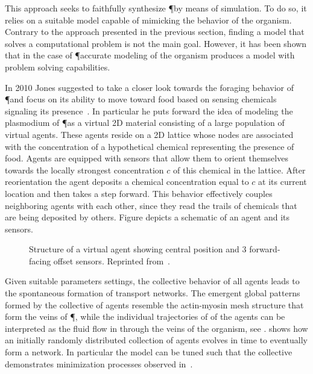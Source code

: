 			This approach seeks to faithfully synthesize \P by means of simulation. To do so, it relies on a suitable model capable of mimicking the behavior of the organism. Contrary to the approach presented in the previous section, finding a model that solves a computational problem is not the main goal. However, it has been shown that in the case of \P accurate modeling of the organism produces a model with problem solving capabilities. 

			In 2010 Jones suggested to take a closer look towards the foraging behavior of \P and focus on its ability to move toward food based on sensing chemicals signaling its presence~\cite{jones2010characteristics}. In particular he puts forward the idea of modeling the plasmodium of \P as a virtual 2D material consisting of a large population of virtual agents. These agents reside on a 2D lattice whose nodes are associated with the concentration of a hypothetical chemical representing the presence of food. Agents are equipped with sensors that allow them to orient themselves towards the locally strongest concentration $c$ of this chemical in the lattice. After reorientation the agent deposits a chemical concentration equal to $c$ at its current location and then takes a step forward. This behavior effectively couples neighboring agents with each other, since they read the trails of chemicals that are being deposited by others. Figure  depicts a schematic of an agent and its sensors.

			\begin{figure}
				\centering
				
				\caption[Multi-agent \P - Agent schematic]{Structure of a virtual agent showing central position and $3$ forward-facing offset sensors. Reprinted from~\cite{jones2010characteristics}.}
				\label{fig:agent}
			\end{figure}

			Given suitable parameters settings, the collective behavior of all agents leads to the spontaneous formation of transport networks. The emergent global patterns formed by the collective of agents resemble the actin-myosin mesh structure that form the veins of \P, while the individual trajectories of of the agents can be interpreted as the fluid flow in through the veins of the organism, see .  shows how an initially randomly distributed collection of agents evolves in time to eventually form a network. In particular the model can be tuned such that the collective demonstrates minimization processes observed in~\cite{jones2011influences,jones2015applications,baumgarten2015network}. 

